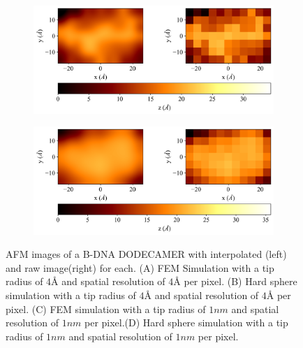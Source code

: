 \begin{figure}[H]
    \begin{subfigure}[t]{0.49\textwidth}
        \centering
        \caption{\label{fig: 1BNA AFM Image-2} }
        \includegraphics[width=1\linewidth]{Figures/AFMSimulationMolecule-1bna-2.png}
    \end{subfigure}
    \hfill
    \begin{subfigure}[t]{0.49\textwidth}
        \centering
        \caption{\label{fig: 1BNA AFM Image HS-2} }
        \includegraphics[width=1\linewidth]{Figures/AFMSimulationMolecule-1bna_HS-2.png}
    \end{subfigure}    
    
    \caption{\label{fig: 1BNA AFM}AFM images of a B-DNA DODECAMER with interpolated (left) and raw image(right) for each. (A) FEM Simulation with a tip radius of $4 \text{\AA}$ and spatial resolution of $4 \text{\AA}$ per pixel. (B) Hard sphere simulation with a tip radius of $4 \text{\AA}$ and spatial resolution of $4 \text{\AA}$ per pixel. (C) FEM simulation with a tip radius of $1 nm$ and spatial resolution of $1 nm$ per pixel.(D) Hard sphere simulation with a tip radius of $1 nm$ and spatial resolution of $1 nm$ per pixel.}
    
\end{figure}